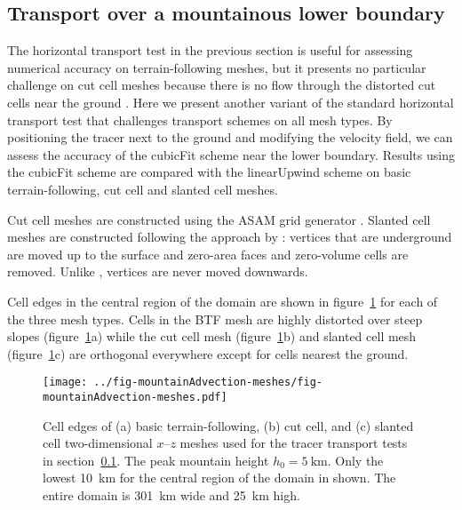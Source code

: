 \subsection{Transport over a mountainous lower boundary}
\label{sec:mountainAdvection}

The horizontal transport test in the previous section is useful for assessing numerical accuracy on terrain-following meshes, but it presents no particular challenge on cut cell meshes because there is no flow through the distorted cut cells near the ground \citep{good2014}.
Here we present another variant of the standard horizontal transport test that challenges transport schemes on all mesh types.  By positioning the tracer next to the ground and modifying the velocity field, we can assess the accuracy of the cubicFit scheme near the lower boundary.  Results using the cubicFit scheme are compared with the linearUpwind scheme on basic terrain-following, cut cell and slanted cell meshes.


Cut cell meshes are constructed using the ASAM grid generator \citep{jaehn2015,asam2010}.  Slanted cell meshes are constructed following the approach by \citep{shaw-weller2016}: vertices that are underground are moved up to the surface and zero-area faces and zero-volume cells are removed.  Unlike \citep{shaw-weller2016}, vertices are never moved downwards.

Cell edges in the central region of the domain are shown in figure~\ref{fig:mountainAdvection-meshes} for each of the three mesh types.
Cells in the BTF mesh are highly distorted over steep slopes (figure~\ref{fig:mountainAdvection-meshes}a) while the cut cell mesh (figure~\ref{fig:mountainAdvection-meshes}b) and slanted cell mesh (figure~\ref{fig:mountainAdvection-meshes}c) are orthogonal everywhere except for cells nearest the ground.

\begin{figure}
	\centering
	\texttt{[image: ../fig-mountainAdvection-meshes/fig-mountainAdvection-meshes.pdf]}
	\caption{Cell edges of (a) basic terrain-following, (b) cut cell, and (c) slanted cell two-dimensional $x$--$z$ meshes used for the tracer transport tests in section~\ref{sec:mountainAdvection}.  The peak mountain height $h_0 = \SI{5}{\kilo\meter}$.  Only the lowest \SI{10}{\kilo\meter} for the central region of the domain in shown.  The entire domain is \SI{301}{\kilo\meter} wide and \SI{25}{\kilo\meter} high.}
	\label{fig:mountainAdvection-meshes}
\end{figure}

